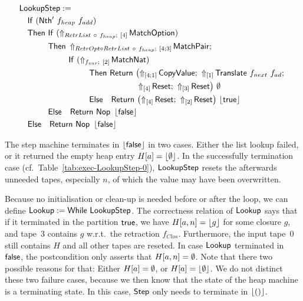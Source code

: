 \begin{definition}[$\MS{LookupStep}$]
  \label{def:Lookup_Step}
  ~
  \begin{align*}
    & \MS{LookupStep} := \\
    & \quad \MS{If}~(\MS{Nth'}~f_{heap}~f_{add}) \\
    & \quad \MS{Then}~\MS{If}~(\LiftBoth{\MS{MatchOption}}{RetrList ~\circ~ f_{heap}}{\Vector{4}}) \\
    & \quad \phantom{\MS{Then}}~\MS{Then}~\LiftBoth{\MS{MatchPair}}{RetrOpt \circ RetrList ~\circ~ f_{heap}}{\Vector{4;3}} \Seq \\
    & \quad \phantom{\MS{Then}~\MS{Then}}~\MS{If}~(\LiftBoth{\MS{MatchNat}}{f_{var}}{\Vector{2}}) \\
    & \quad \phantom{\MS{Then}~\MS{Then}~\MS{Then}}~\MS{Then}~ \MS{Return}~\bigl(
      \LiftTapes{\MS{CopyValue}}{\Vector{4;1}} \Seq
      \LiftTapes{\MS{Translate}~f_{next}~f_{ad}}{\Vector{1}} \Seq \\
    & \quad \phantom{\MS{Then}~\MS{Then}~\MS{Then}~\MS{Then}~\MS{Return}\bigl(}
      \LiftTapes{\MS{Reset}}{\Vector{4}} \Seq
      \LiftTapes{\MS{Reset}}{\Vector{3}}
      \bigr)~{\None} \\
    & \quad \phantom{\MS{Then}~\MS{Then}~\MS{Then}}~\MS{Else}~~~ \MS{Return}~\bigl(
      \LiftTapes{\MS{Reset}}{\Vector{4}} \Seq
      \LiftTapes{\MS{Reset}}{\Vector{2}}
      \bigr)~{\Some\true} \\
    & \quad \phantom{\MS{Then}}~\MS{Else}~~~ \Return{\Nop}{\Some\false} \\
    & \quad \MS{Else}~~~ \Return{\Nop}{\Some\false}
  \end{align*}
\end{definition}

The step machine terminates in $\left\lfloor {\ensuremath{\mathsf{false}}} \right\rfloor$ in two cases.  Either the list lookup failed, or it returned the empty heap entry $H[a]=\left\lfloor {\emptyset} \right\rfloor$.  In
the successfully termination case (cf.\ Table~\ref{tab:exec-LookupStep-0}), $\MS{LookupStep}$ resets the afterwards unneeded tapes, especially $n$, of
which the value may have been overwritten.

Because no initialisation or clean-up is needed before or after the loop, we can define $\mathsf{Lookup} := \mathsf{While}~\mathsf{LookupStep}$.  The correctness
relation of $\mathsf{Lookup}$ says that if it terminated in the partition $\mathsf{true}$, we have $H[a,n] = \left\lfloor {g} \right\rfloor$ for some closure $g$, and tape~$3$ contains
$g$ w.r.t.\ the retraction $f_{Clos}$.  Furthermore, the input tape~$0$ still contains $H$ and all other tapes are reseted.  In case $\mathsf{Lookup}$
terminated in $\mathsf{false}$, the postcondition only asserts that $H[a,n]=\emptyset$.  Note that there two possible reasons for that: Either $H[a]=\emptyset$, or
$H[a]=\left\lfloor {\emptyset} \right\rfloor$.  We do not distinct these two failure cases, because we then know that the state of the heap machine is a terminating state.  In
this case, $\mathsf{Step}$ only needs to terminate in $\left\lfloor {\ensuremath{\mathsf{()}}} \right\rfloor$.

